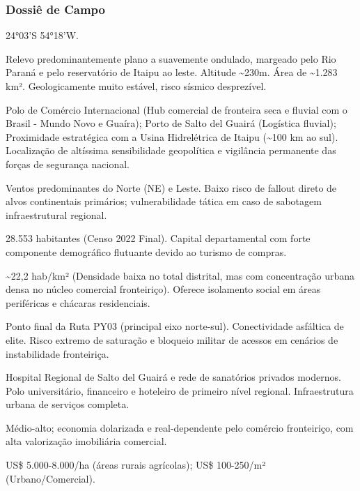 \subsubsection{Dossiê de Campo}
\begin{description}[style=nextline,leftmargin=0.5cm,font=\bfseries]
\item[Coordenadas]  24°03'S 54°18'W.
\item[Topografia]  Relevo predominantemente plano a suavemente ondulado, margeado pelo Rio Paraná e pelo reservatório de Itaipu ao leste. Altitude \textasciitilde 230m. Área de \textasciitilde 1.283 km². Geologicamente muito estável, risco sísmico desprezível.
\item[Alvos Estratégicos]  Polo de Comércio Internacional (Hub comercial de fronteira seca e fluvial com o Brasil - Mundo Novo e Guaíra); Porto de Salto del Guairá (Logística fluvial); Proximidade estratégica com a Usina Hidrelétrica de Itaipu (\textasciitilde 100 km ao sul). Localização de altíssima sensibilidade geopolítica e vigilância permanente das forças de segurança nacional.
\item[Fallout]  Ventos predominantes do Norte (NE) e Leste. Baixo risco de fallout direto de alvos continentais primários; vulnerabilidade tática em caso de sabotagem infraestrutural regional.
\item[População]  28.553 habitantes (Censo 2022 Final). Capital departamental com forte componente demográfico flutuante devido ao turismo de compras.
\item[Densidade]  \textasciitilde 22,2 hab/\allowbreak km² (Densidade baixa no total distrital, mas com concentração urbana densa no núcleo comercial fronteiriço). Oferece isolamento social em áreas periféricas e chácaras residenciais.
\item[Vias de Acesso]  Ponto final da Ruta PY03 (principal eixo norte-sul). Conectividade asfáltica de elite. Risco extremo de saturação e bloqueio militar de acessos em cenários de instabilidade fronteiriça.
\item[Serviços]  Hospital Regional de Salto del Guairá e rede de sanatórios privados modernos. Polo universitário, financeiro e hoteleiro de primeiro nível regional. Infraestrutura urbana de serviços completa.
\item[Custo de Vida]  Médio-alto; economia dolarizada e real-dependente pelo comércio fronteiriço, com alta valorização imobiliária comercial.
\item[Preço da Terra]  US\$ 5.000-8.000/\allowbreak ha (áreas rurais agrícolas); US\$ 100-250/\allowbreak m² (Urbano/\allowbreak Comercial).

\end{description}
